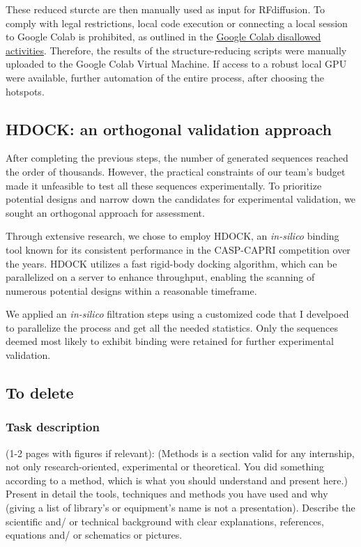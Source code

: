 \documentclass[11pt,a4paper]{article}
\begin{document}
These reduced sturcte are then manually used as input for RFdiffusion. To comply with legal restrictions, local code execution or connecting a local session to Google Colab is prohibited, as outlined in the \href{https://research.google.com/colaboratory/faq.html#disallowed-activities}{Google Colab disallowed activities}. Therefore, the results of the structure-reducing scripts were manually uploaded to the Google Colab Virtual Machine. If access to a robust local GPU were available, further automation of the entire process, after choosing the hotspots. 

\subsection{HDOCK: an orthogonal validation approach}

After completing the previous steps, the number of generated sequences reached the order of thousands. However, the practical constraints of our team's budget made it unfeasible to test all these sequences experimentally. To prioritize potential designs and narrow down the candidates for experimental validation, we sought an orthogonal approach for assessment.

Through extensive research, we chose to employ HDOCK, an \emph{in-silico} binding tool known for its consistent performance in the CASP-CAPRI \cite{casp-capri} competition over the years. HDOCK utilizes a fast rigid-body docking algorithm, which can be parallelized on a server to enhance throughput, enabling the scanning of numerous potential designs within a reasonable timeframe.

We applied an \emph{in-silico} filtration steps using a customized code that I develpoed to parallelize the process and get all the needed statistics. Only the sequences deemed most likely to exhibit binding were retained for further experimental validation.

\subsection{To delete}

\subsubsection{Task description}
(1-2 pages with figures if relevant): (Methods is a section valid for any internship, not only research-oriented, experimental or theoretical. You did something according to a method, which is what you should understand and present here.)
Present in detail the tools, techniques and methods you have used and why (giving a list of library's or equipment's name is not a presentation). 
Describe the scientific and/ or technical background with clear explanations, references, equations and/ or schematics or pictures. 
\end{document}
